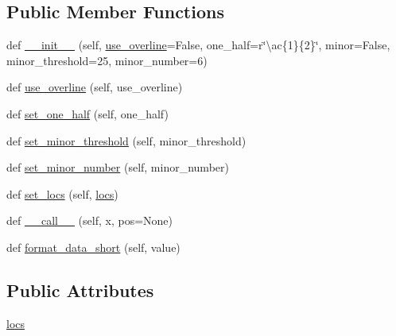 \subsection*{Public Member Functions}
\begin{DoxyCompactItemize}
\item 
def \hyperlink{classmatplotlib_1_1ticker_1_1LogitFormatter_a2183bcd411372f9df66cd49fad3ccca7}{\+\_\+\+\_\+init\+\_\+\+\_\+} (self, \hyperlink{classmatplotlib_1_1ticker_1_1LogitFormatter_a06a8cecbc20660d3c48cff86356eb835}{use\+\_\+overline}=False, one\+\_\+half=r\char`\"{}\textbackslash{}ac\{1\}\{2\}\char`\"{}, minor=False, minor\+\_\+threshold=25, minor\+\_\+number=6)
\item 
def \hyperlink{classmatplotlib_1_1ticker_1_1LogitFormatter_a06a8cecbc20660d3c48cff86356eb835}{use\+\_\+overline} (self, use\+\_\+overline)
\item 
def \hyperlink{classmatplotlib_1_1ticker_1_1LogitFormatter_a65fc194bf13642e9f72098b07ffc2233}{set\+\_\+one\+\_\+half} (self, one\+\_\+half)
\item 
def \hyperlink{classmatplotlib_1_1ticker_1_1LogitFormatter_a715a09ef25cd17dd1f09bb1ee80be3df}{set\+\_\+minor\+\_\+threshold} (self, minor\+\_\+threshold)
\item 
def \hyperlink{classmatplotlib_1_1ticker_1_1LogitFormatter_ab9bf9643850834554b42f009493c1f80}{set\+\_\+minor\+\_\+number} (self, minor\+\_\+number)
\item 
def \hyperlink{classmatplotlib_1_1ticker_1_1LogitFormatter_a17bb706d812121d4007b3a94a336b380}{set\+\_\+locs} (self, \hyperlink{classmatplotlib_1_1ticker_1_1LogitFormatter_a9aec1538b923c7a83ce5269964c33940}{locs})
\item 
def \hyperlink{classmatplotlib_1_1ticker_1_1LogitFormatter_ad7dcb2c5b656b3ec474f5ed19872c403}{\+\_\+\+\_\+call\+\_\+\+\_\+} (self, x, pos=None)
\item 
def \hyperlink{classmatplotlib_1_1ticker_1_1LogitFormatter_a99b6283e713459e69d328fb3b380e5f9}{format\+\_\+data\+\_\+short} (self, value)
\end{DoxyCompactItemize}
\subsection*{Public Attributes}
\begin{DoxyCompactItemize}
\item 
\hyperlink{classmatplotlib_1_1ticker_1_1LogitFormatter_a9aec1538b923c7a83ce5269964c33940}{locs}
\end{DoxyCompactItemize}
